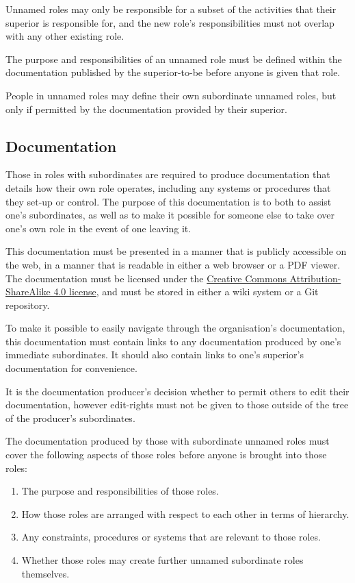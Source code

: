Unnamed roles may only be responsible for a subset of the activities that their superior is responsible for, and the new role's responsibilities must not overlap with any other existing role.

The purpose and responsibilities of an unnamed role must be defined within the documentation published by the superior-to-be before anyone is given that role.

People in unnamed roles may define their own subordinate unnamed roles, but only if permitted by the documentation provided by their superior.

\subsection{Documentation}
\label{sec:documentation}

Those in roles with subordinates are required to produce documentation that details how their own role operates, including any systems or procedures that they set-up or control.  The purpose of this documentation is to both to assist one's subordinates, as well as to make it possible for someone else to take over one's own role in the event of one leaving it.

This documentation must be presented in a manner that is publicly accessible on the web, in a manner that is readable in either a web browser or a PDF viewer.  The documentation must be licensed under the \href{http://creativecommons.org/licenses/by-sa/4.0/}{Creative Commons Attribution-ShareAlike 4.0 license}, and must be stored in either a wiki system or a Git repository.

To make it possible to easily navigate through the organisation's documentation, this documentation must contain links to any documentation produced by one's immediate subordinates.  It should also contain links to one's superior's documentation for convenience.

It is the documentation producer's decision whether to permit others to edit their documentation, however edit-rights must not be given to those outside of the tree of the producer's subordinates.

The documentation produced by those with subordinate unnamed roles must cover the following aspects of those roles before anyone is brought into those roles:
\begin{enumerate}
\item The purpose and responsibilities of those roles.
\item How those roles are arranged with respect to each other in terms of hierarchy.
\item Any constraints, procedures or systems that are relevant to those roles.
\item Whether those roles may create further unnamed subordinate roles themselves.
\end{enumerate}

